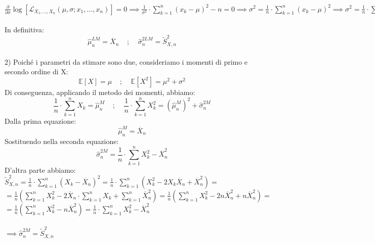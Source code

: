 \documentclass{article}
\begin{document}
$\frac{\partial}{\partial \sigma}\log[\mathcal{L}_{X_{1},...,X_{n}}(\mu, \sigma; x_{1},...,x_{n})] = 0 \implies \frac{1}{\sigma^{2}}\cdot \sum_{k=1}^{n}(x_{k}-\mu)^{2} - n = 0 \implies \sigma^{2} = \frac{1}{n}\cdot \sum_{k=1}^{n}(x_{k}-\mu)^{2} \implies \sigma^{2} = \frac{1}{n}\cdot \sum_{k=1}^{n}(x_{k}-\overline{x}_{n})^{2}$\\ \\
In definitiva:
\[ \hat{\mu}_{n}^{LM} = \overline{X}_{n} \; \; \; \; ; \; \; \; \; \hat{\sigma}_{n}^{2LM} = \widetilde{S}_{X,n}^{2} \]
\\
2) Poiché i parametri da stimare sono due, consideriamo i momenti di primo e secondo ordine di X:
\[ \mathbb{E}[X] = \mu \; \; \; \; ; \; \; \; \; \mathbb{E}[X^{2}] = \mu^{2}+\sigma^{2} \]
Di conseguenza, applicando il metodo dei momenti, abbiamo:
\[ \frac{1}{n}\cdot \sum_{k=1}^{n}X_{k} = \hat{\mu}_{n}^{M} \; \; \; \; ; \; \; \; \; \frac{1}{n}\cdot \sum_{k=1}^{n}X_{k}^{2} = (\hat{\mu}_{n}^{M})^{2} + \hat{\sigma}_{n}^{2M} \]
Dalla prima equazione:
\[ \hat{\mu}_{n}^{M} = \overline{X}_{n} \]
Sostituendo nella seconda equazione:
\[ \hat{\sigma}_{n}^{2M} = \frac{1}{n}\cdot \sum_{k=1}^{n}X_{k}^{2} - \overline{X}_{n}^{2} \]
D'altra parte abbiamo:\\
$\widetilde{S}_{X,n}^{2} = \frac{1}{n}\cdot \sum_{k=1}^{n}(X_{k} - \overline{X}_{n})^{2} = \frac{1}{n}\cdot \sum_{k=1}^{n}(X_{k}^{2} - 2X_{k}\overline{X}_{n} + \overline{X}_{n}^{2}) =$\\
$=\frac{1}{n}(\sum_{k=1}^{n}X_{k}^{2} - 2\overline{X}_{n}\cdot \sum_{k=1}^{n}X_{k} + \sum_{k=1}^{n}\overline{X}_{n}^{2}) = \frac{1}{n}(\sum_{k=1}^{n}X_{k}^{2} - 2n\overline{X}_{n}^{2} + n\overline{X}_{n}^{2}) =$\\
$=\frac{1}{n}(\sum_{k=1}^{n}X_{k}^{2} - n\overline{X}_{n}^{2}) = \frac{1}{n} \cdot \sum_{k=1}^{n}X_{k}^{2} - \overline{X}_{n}^{2}$\\ \\
$\implies \hat{\sigma}_{n}^{2M} = \widetilde{S}_{X,n}^{2}$
\end{document}
